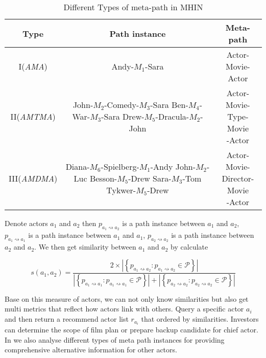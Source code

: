 \begin{table}[!htb]
  \centering
  \begin{tabular}{c|c|c}
  \hline
  Type & Path instance & Meta-path \\
  \hline
  I(\emph{AMA})& Andy-$M_1$-Sara & \tabincell{c}{Actor-\\Movie-Actor}  \\
  \hline
  II(\emph{AMTMA}) & \tabincell{c}{John-$M_2$-Comedy-$M_3$-Sara\\Ben-$M_4$-War-$M_3$-Sara\\Drew-$M_5$-Dracula-$M_2$-John} & \tabincell{c}{Actor-Movie-\\Type-Movie\\-Actor} \\
  \hline
  III(\emph{AMDMA}) & \tabincell{c}{Diana-$M_6$-Spielberg-$M_1$-Andy\\John-$M_2$-Luc Besson-$M_5$-Drew\\Sara-$M_3$-Tom Tykwer-$M_5$-Drew} & \tabincell{c}{Actor-Movie-\\Director-Movie\\-Actor}\\
  \hline
  \end{tabular}
  \caption{Different Types of meta-path in MHIN}\label{tab:metapath}
\end{table}

Denote actors $a_1$ and $a_2$ then $p_{a_1 \rightsquigarrow a_2}$ is a path instance between $a_1$ and $a_2$, $p_{a_1 \rightsquigarrow a_1}$ is a path instance between $a_1$ and $a_1$, $p_{a_2 \rightsquigarrow a_2}$ is a path instance between $a_2$ and $a_2$. We then get similarity between $a_1$ and $a_2$ by calculate

\begin{equation}
  s(a_1,a_2) = \frac{2 \times |\left\{p_{a_1 \rightsquigarrow a_2}: p_{a_1 \rightsquigarrow a_2} \in \mathcal{P} \right\}|}{|\left\{p_{a_1 \rightsquigarrow a_1}: p_{a_1 \rightsquigarrow a_1} \in \mathcal{P} \right\}| + |\left\{p_{a_2 \rightsquigarrow a_2}: p_{a_2 \rightsquigarrow a_2} \in \mathcal{P} \right\}|}
\end{equation}

Base on this measure of actors, we can not only know similarities but also get multi metrics that reflect how actors link with others. Query a specific actor $a_i$and then return a recommend actor list $r_{a_i}$ that ordered by similarities. Investors can determine the scope of film plan or prepare backup candidate for chief actor. In \system we also analyse different types of meta path instances for providing comprehensive alternative information for other actors.
